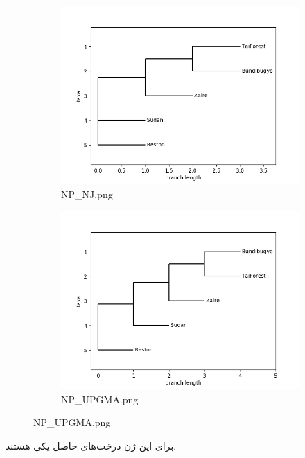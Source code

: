 \documentclass[11pt]{article}
\begin{document}
\begin{figure}[h]
  \centering
  \begin{subfigure}[b]{0.4\linewidth}
    \includegraphics[width=\linewidth]{../Data/Trees/NP_NJ.png}
    \caption{NP\_NJ.png}
  \end{subfigure}
  \begin{subfigure}[b]{0.4\linewidth}
    \includegraphics[width=\linewidth]{../Data/Trees/NP_UPGMA.png}
    \caption{NP\_UPGMA.png}
  \end{subfigure}
\end{figure}
\newline
برای این ژن درخت‌های حاصل یکی هستند.
\newline
\end{document}
